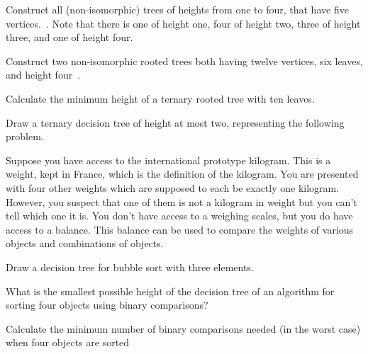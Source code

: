 

\begin{questions}


\question
Construct all (non-isomorphic) trees of heights from one to four, that have five vertices.~\cite{biggs02}. Note that there is one of height one, four of height two, three of height three, and one of height four.
\begin{solution}
\end{solution}


\question
Construct two non-isomorphic rooted trees both having twelve vertices, six leaves, and height four~\cite{biggs02}.
\begin{solution}
\end{solution}

\question
Calculate the minimum height of a ternary rooted tree with ten leaves.
\begin{solution}

\end{solution}

\question
Draw a ternary decision tree of height at most two, representing the following problem.

Suppose you have access to the international prototype kilogram.
This is a weight, kept in France, which is the definition of the kilogram.
You are presented with four other weights which are supposed to each be exactly one kilogram.
However, you suspect that one of them is not a kilogram in weight but you can't tell which one it is.
You don't have access to a weighing scales, but you do have access to a balance.
This balance can be used to compare the weights of various objects and combinations of objects.~\cite{biggs02}
\begin{solution}
\end{solution}

\question
Draw a decision tree for bubble sort with three elements.~\cite{biggs02}
\begin{solution}
\end{solution}



\question
What is the smallest possible height of the decision tree of an algorithm for sorting four objects using binary comparisons?~\cite{biggs02}
\begin{solution}
\end{solution}

\question
Calculate the minimum number of binary comparisons needed (in the worst case) when four objects are sorted~\cite{biggs02}
\begin{parts}

\end{parts}
\end{questions}
